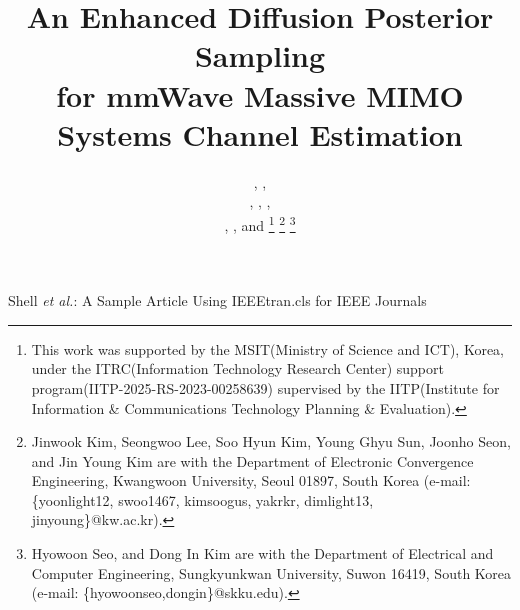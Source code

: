 \documentclass[lettersize,journal]{IEEEtran}
\begin{document}
\title{An Enhanced Diffusion Posterior Sampling \\ for mmWave Massive MIMO Systems Channel Estimation}

\author{,  ,

, ,
,

, , and 
\thanks{This work was 
supported by the MSIT(Ministry of Science and ICT), Korea, under the ITRC(Information Technology Research Center) support program(IITP-2025-RS-2023-00258639) supervised by the IITP(Institute for Information \& Communications Technology Planning \& Evaluation).}%
\thanks{Jinwook Kim, Seongwoo Lee, Soo Hyun Kim, Young Ghyu Sun, Joonho Seon, and Jin Young Kim are with the Department of Electronic Convergence Engineering, Kwangwoon University, Seoul 01897, South Korea (e-mail: \{yoonlight12, swoo1467, kimsoogus, yakrkr, dimlight13, jinyoung\}@kw.ac.kr).}
\thanks{Hyowoon Seo, and Dong In Kim are with the Department of Electrical and Computer Engineering, Sungkyunkwan University, Suwon 16419, South Korea (e-mail: \{hyowoonseo,dongin\}@skku.edu).}}


%
{Shell \MakeLowercase{\textit{et al.}}: A Sample Article Using IEEEtran.cls for IEEE Journals}
\end{document}
